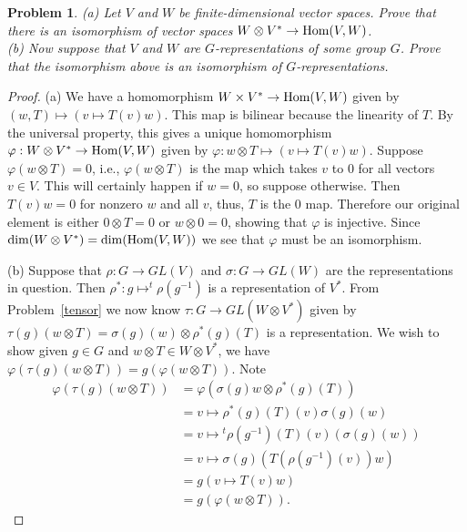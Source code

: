 \documentclass{article}
\newtheorem{problem}{Problem}
\renewcommand{\hom}{\textup{Hom}}
\begin{document}
\begin{problem}
(a) Let $V$ and $W$ be finite-dimensional vector spaces. Prove that there is an isomorphism of vector spaces $W \otimes V^* \to \hom(V,W)$.\\
(b) Now suppose that $V$ and $W$ are $G$-representations of some group $G$. Prove that the isomorphism above is an isomorphism of $G$-representations.
\end{problem}
\begin{proof}
(a) We have a homomorphism $W \times V^* \to \hom(V,W)$ given by $(w,T) \mapsto (v \mapsto T(v)w)$. This map is bilinear because the linearity of $T$. By the universal property, this gives a unique homomorphism $\varphi : W \otimes V^* \to \hom(V,W)$ given by $\varphi : w \otimes T \mapsto (v \mapsto T(v)w)$. Suppose $\varphi(w \otimes T) = 0$, i.e., $\varphi(w \otimes T)$ is the map which takes $v$ to $0$ for all vectors $v \in V$. This will certainly happen if $w = 0$, so suppose otherwise. Then $T(v)w = 0$ for nonzero $w$ and all $v$, thus, $T$ is the $0$ map. Therefore our original element is either $0 \otimes T = 0$ or $w \otimes 0 = 0$, showing that $\varphi$ is injective. Since $\dim (W \otimes V^*) = \dim (\hom(V,W))$ we see that $\varphi$ must be an isomorphism.

(b) Suppose that $\rho : G \to GL(V)$ and $\sigma : G \to GL(W)$ are the representations in question. Then $\rho^* : g \mapsto ^t \rho(g^{-1})$ is a representation of $V^*$. From Problem~\ref{tensor} we now know $\tau : G \to GL(W \otimes V^*)$ given by $\tau(g)(w \otimes T) = \sigma(g)(w) \otimes \rho^*(g)(T)$ is a representation. We wish to show given $g \in G$ and $w \otimes T \in W \otimes V^*$, we have $\varphi(\tau(g)(w \otimes T)) = g(\varphi(w \otimes T))$. Note
\begin{align*}
\varphi(\tau(g)(w \otimes T))
&= \varphi(\sigma(g)w \otimes \rho^*(g)(T))\\
&= v \mapsto \rho^*(g)(T)(v)\sigma(g)(w)\\
&= v \mapsto {^t\rho}(g^{-1})(T)(v)(\sigma(g)(w))\\
&= v \mapsto \sigma(g)(T(\rho(g^{-1})(v))w)\\
&= g(v \mapsto T(v)w)\\
&= g(\varphi(w \otimes T)).
\end{align*}
\end{proof}
\end{document}
